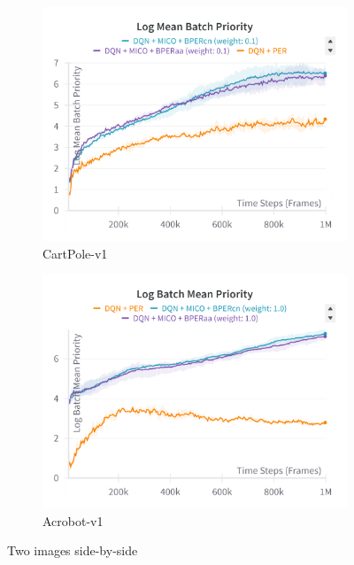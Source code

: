 \begin{figure}[h]
    \hfill
    \begin{subfigure}{0.45\textwidth}
        \includegraphics[width=\linewidth]{Results/general_results/log_mean_batch_priority_cartpolev1.png}
        \caption{CartPole-v1}
        \label{fig:log_mean_batch_priority_cartpolev1}
    \end{subfigure}
    \hfill
    \begin{subfigure}{0.45\textwidth}
        \includegraphics[width=\linewidth]{Results/general_results/log_mean_batch_priority_acrobot.png}
        \caption{Acrobot-v1}
        \label{fig:log_mean_batch_priority_acrobot}
    \end{subfigure}
    \caption{Two images side-by-side}
    \label{fig:log_mean_batch_priority_methods}
\end{figure}

